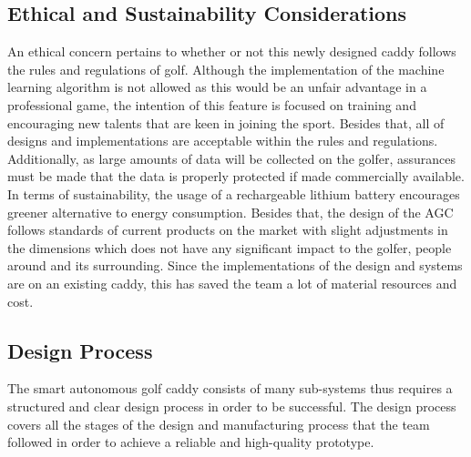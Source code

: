 \documentclass[11pt,landscape]{article}
\begin{document}
\begin{multicols}{2}
\subsection{Ethical and Sustainability Considerations}
An ethical concern pertains to whether or not this newly designed caddy follows
the rules and regulations of golf. Although the implementation of the machine
learning algorithm is not allowed as this would be an unfair advantage in a
professional game, the intention of this feature is focused on training and
encouraging new talents that are keen in joining the sport. Besides that, all of
designs and implementations are acceptable within the rules and regulations.
Additionally, as large amounts of data will be collected on the golfer,
assurances must be made that the data is properly protected if made commercially
available. In terms of sustainability, the usage of a rechargeable lithium
battery encourages greener alternative to energy consumption. Besides that, the
design of the AGC follows standards of current products on the market with
slight adjustments in the dimensions which does not have any significant impact
to the golfer, people around and its surrounding. Since the implementations of
the design and systems are on an existing caddy, this has saved the team a lot
of material resources and cost.  

\subsection{Design Process}
The smart autonomous golf caddy consists of many sub-systems thus requires a
structured and clear design process in order to be successful. The design
process covers all the stages of the design and manufacturing process that the
team followed in order to achieve a reliable and high-quality prototype.


\end{multicols}
\end{document}

